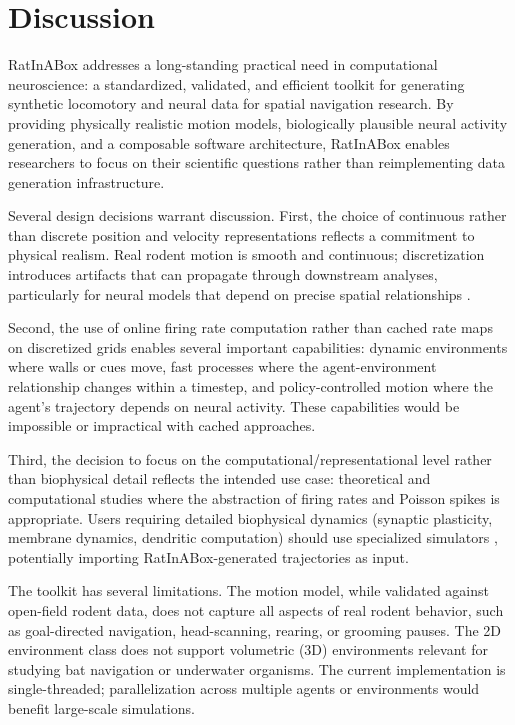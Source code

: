\documentclass[12pt]{article}
\begin{document}
\section{Discussion}

RatInABox addresses a long-standing practical need in computational neuroscience: a standardized, validated, and efficient toolkit for generating synthetic locomotory and neural data for spatial navigation research. By providing physically realistic motion models, biologically plausible neural activity generation, and a composable software architecture, RatInABox enables researchers to focus on their scientific questions rather than reimplementing data generation infrastructure.

Several design decisions warrant discussion. First, the choice of continuous rather than discrete position and velocity representations reflects a commitment to physical realism. Real rodent motion is smooth and continuous; discretization introduces artifacts that can propagate through downstream analyses, particularly for neural models that depend on precise spatial relationships \citep{foster2006sequence}.

Second, the use of online firing rate computation rather than cached rate maps on discretized grids enables several important capabilities: dynamic environments where walls or cues move, fast processes where the agent-environment relationship changes within a timestep, and policy-controlled motion where the agent's trajectory depends on neural activity. These capabilities would be impossible or impractical with cached approaches.

Third, the decision to focus on the computational/representational level rather than biophysical detail reflects the intended use case: theoretical and computational studies where the abstraction of firing rates and Poisson spikes is appropriate. Users requiring detailed biophysical dynamics (synaptic plasticity, membrane dynamics, dendritic computation) should use specialized simulators \citep{hines1997neuron}, potentially importing RatInABox-generated trajectories as input.

The toolkit has several limitations. The motion model, while validated against open-field rodent data, does not capture all aspects of real rodent behavior, such as goal-directed navigation, head-scanning, rearing, or grooming pauses. The 2D environment class does not support volumetric (3D) environments relevant for studying bat navigation or underwater organisms. The current implementation is single-threaded; parallelization across multiple agents or environments would benefit large-scale simulations.
\end{document}
